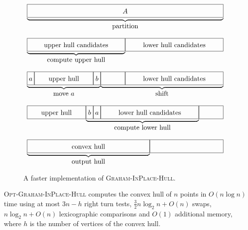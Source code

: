 \documentclass{elsart}
\begin{document}
\begin{figure}
\begin{center}
$\begin{array}{c}
   \underbrace{\framebox[4in]{\fillit $A$}} \\
   \mbox{partition}
\end{array}$

\vspace{2ex}

$\begin{array}{c@{}c}
   \underbrace{\framebox[2in]{\fillit upper hull candidates}} &
      \framebox[2in]{\fillit lower hull candidates} \\
   \mbox{compute upper hull}
\end{array}$

\vspace{2ex}

$\begin{array}{c@{}c}
   \underbrace{\framebox[.15in]{\fillit $a$}
	\framebox[1.2in]{\fillit upper hull}\framebox[.15in]{\fillit $b$}} &
      \underbrace{\framebox[.5in]{\fillit}
	\framebox[2in]{\fillit lower hull candidates}} \\
   \mbox{move $a$} & \mbox{shift}
\end{array}$

\vspace{2ex}

$\begin{array}{c@{}c@{}c}
	\framebox[1.2in]{\fillit upper hull}
	& \underbrace{\framebox[.15in]{\fillit $b$}
	  \framebox[.15in]{\fillit $a$}
      \framebox[2in]{\fillit lower hull candidates}} & 
	\framebox[.5in]{\fillit} \\
         & \mbox{compute lower hull} 
\end{array}$

\vspace{2ex}

$\begin{array}{c@{}c@{}c}
	\underbrace{\framebox[2.5in]{\fillit convex hull}}
	& \framebox[1.5in]{\fillit } \\
	\mbox{output hull}

\end{array}$

\end{center}
\caption{A faster implementation of \textsc{Graham-InPlace-Hull}.}
\end{figure}

\begin{thm}
\textsc{Opt-Graham-InPlace-Hull} computes the convex hull of $n$
points in $O(n\log n)$ time using at most $3n-h$ right turn tests,
$\frac{3}{2}n\log_2 n+O(n)$ swaps, $n\log_2 n+O(n)$ lexicographic
comparisons and $O(1)$ additional memory, where $h$ is the number of
vertices of the convex hull.
\end{thm}
\end{document}
